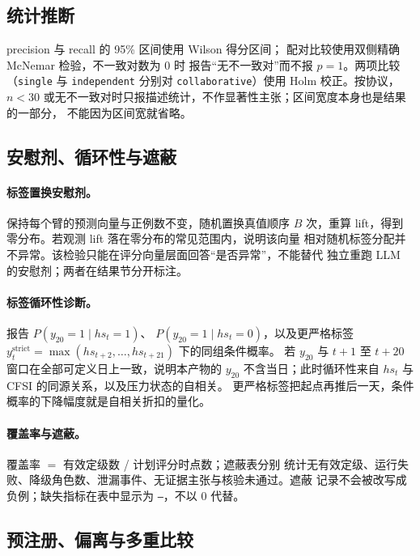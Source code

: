 \documentclass[UTF8,fontset=fandol,11pt,a4paper]{ctexart}
\begin{document}
\subsection{统计推断}

precision 与 recall 的 95\% 区间使用 Wilson 得分区间\citep{wilson1927probable}；
配对比较使用双侧精确 McNemar 检验\citep{mcnemar1947note}，不一致对数为 0 时
报告“无不一致对”而不报 $p=1$。两项比较（\texttt{single} 与
\texttt{independent} 分别对 \texttt{collaborative}）使用 Holm 校正。按协议，
$n<30$ 或无不一致对时只报描述统计，不作显著性主张；区间宽度本身也是结果的一部分，
不能因为区间宽就省略。

\subsection{安慰剂、循环性与遮蔽}

\paragraph{标签置换安慰剂。} 保持每个臂的预测向量与正例数不变，随机置换真值顺序
$B$ 次，重算 lift，得到零分布。若观测 lift 落在零分布的常见范围内，说明该向量
相对随机标签分配并不异常。该检验只能在评分向量层面回答“是否异常”，不能替代
独立重跑 LLM 的安慰剂；两者在结果节分开标注。

\paragraph{标签循环性诊断。} 报告 $P(y_{20}=1\mid hs_t=1)$、
$P(y_{20}=1\mid hs_t=0)$，以及更严格标签
$y^{\mathrm{strict}}_t=\max(hs_{t+2},\dots,hs_{t+21})$ 下的同组条件概率。
若 $y_{20}$ 与 $t+1$ 至 $t+20$ 窗口在全部可定义日上一致，说明本产物的 $y_{20}$
不含当日；此时循环性来自 $hs_t$ 与 CFSI 的同源关系，以及压力状态的自相关。
更严格标签把起点再推后一天，条件概率的下降幅度就是自相关折扣的量化。

\paragraph{覆盖率与遮蔽。} 覆盖率 $=$ 有效定级数 / 计划评分时点数；遮蔽表分别
统计无有效定级、运行失败、降级角色数、泄漏事件、无证据主张与核验未通过。遮蔽
记录不会被改写成负例；缺失指标在表中显示为 \texttt{--}，不以 0 代替。

\subsection{预注册、偏离与多重比较}
\end{document}

